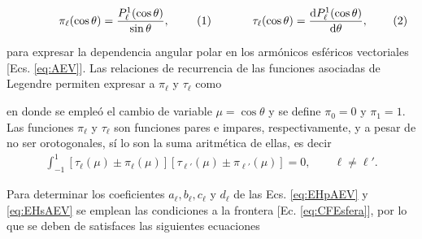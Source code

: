 	\begin{subequations}
	\eqhalf{\pi_\ell(\cos\theta)= \frac{P_\ell^1(\cos\theta)}{\sin\theta},
		\label{eqs:pi}}
	\eqhalf{\tau_\ell(\cos\theta) = \dv{P_\ell^1(\cos\theta)}{\theta},
		\label{eqs:tau}}	
	\label{eq:pitau}		
	\end{subequations}\vspace*{-1em}

\noindent para expresar la dependencia angular polar en los armónicos esféricos vectoriales [Ecs. \eqref{eq:AEV}]. Las relaciones de recurrencia de las funciones asociadas de Legendre \cite{arfken2001methods} permiten expresar a  $\pi_\ell$ y $\tau_\ell$ como  \cite{bohren1998absorption}  

		\vspace*{-1em}

\noindent en donde se empleó el cambio de variable $\mu = \cos\theta$ y se define   $\pi_0 =0 $ y $\pi_1 = 1$.  Las funciones $\pi_\ell$ y $\tau_\ell$ son funciones pares e impares, respectivamente, y a pesar de no ser orotogonales, sí lo son la suma aritmética de ellas, es decir \cite{bohren1998absorption}
	\begin{align}
	\int_{-1}^{1}[\tau_\ell(\mu)\pm\pi_\ell(\mu)]
	[\tau_{\ell'}(\mu)\pm\pi_{\ell'}(\mu)] = 0, \qquad \ell\neq \ell'. 
	\label{eq:ortTauPi}
	\end{align}

Para determinar los coeficientes $a_\ell,b_\ell,c_\ell$ y $d_\ell$ de las Ecs. \eqref{eq:EHpAEV} y \eqref{eq:EHsAEV} se emplean las condiciones a la frontera [Ec. \eqref{eq:CFEsfera}], por lo que se deben de satisfaces las siguientes ecuaciones 

	\vspace*{-1em}

